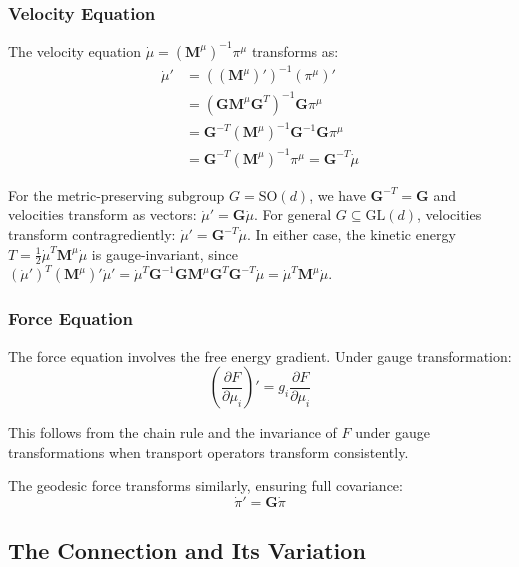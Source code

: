 \documentclass[12pt]{article}
\begin{document}
\subsubsection{Velocity Equation}

The velocity equation $\dot{\mu} = (\mathbf{M}^\mu)^{-1}\pi^\mu$ transforms as:
\begin{align}
\dot{\mu}' &= ((\mathbf{M}^\mu)')^{-1}(\pi^\mu)' \nonumber\\
&= (\mathbf{G}\mathbf{M}^\mu\mathbf{G}^T)^{-1}\mathbf{G}\pi^\mu \nonumber\\
&= \mathbf{G}^{-T}(\mathbf{M}^\mu)^{-1}\mathbf{G}^{-1}\mathbf{G}\pi^\mu \nonumber\\
&= \mathbf{G}^{-T}(\mathbf{M}^\mu)^{-1}\pi^\mu = \mathbf{G}^{-T}\dot{\mu}
\end{align}

For the metric-preserving subgroup $G = \mathrm{SO}(d)$, we have $\mathbf{G}^{-T} = \mathbf{G}$ and velocities transform as vectors: $\dot{\mu}' = \mathbf{G}\dot{\mu}$. For general $G \subseteq \mathrm{GL}(d)$, velocities transform contragrediently: $\dot{\mu}' = \mathbf{G}^{-T}\dot{\mu}$. In either case, the kinetic energy $T = \frac{1}{2}\dot{\mu}^T\mathbf{M}^\mu\dot{\mu}$ is gauge-invariant, since $(\dot{\mu}')^T(\mathbf{M}^\mu)'\dot{\mu}' = \dot{\mu}^T\mathbf{G}^{-1}\mathbf{G}\mathbf{M}^\mu\mathbf{G}^T\mathbf{G}^{-T}\dot{\mu} = \dot{\mu}^T\mathbf{M}^\mu\dot{\mu}$.

\subsubsection{Force Equation}

The force equation involves the free energy gradient. Under gauge transformation:
\begin{equation}
\left(\frac{\partial F}{\partial\mu_i}\right)' = g_i \frac{\partial F}{\partial\mu_i}
\end{equation}

This follows from the chain rule and the invariance of $F$ under gauge transformations when transport operators transform consistently.

The geodesic force transforms similarly, ensuring full covariance:
\begin{equation}
\boxed{\dot{\pi}' = \mathbf{G}\dot{\pi}}
\end{equation}

\subsection{The Connection and Its Variation}
\end{document}
